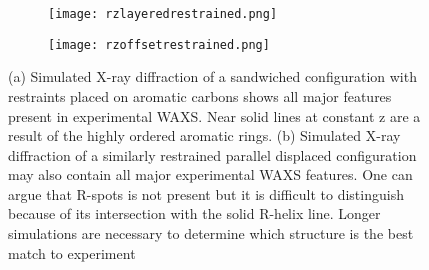 \begin{figure}
	\centering
	\begin{subfigure}{0.475\textwidth}
		\hspace{-1.2cm}
		\centering
		\texttt{[image: rzlayeredrestrained.png]}
		\caption{}\label{fig:rzplayeredrestrained}
	\end{subfigure}
	\begin{subfigure}{0.475\textwidth}
		\hspace{-1.2cm}
		\centering
		\texttt{[image: rzoffsetrestrained.png]}
		\caption{}\label{fig:rzoffsetrestrained}
	\end{subfigure}
	\caption{(a) Simulated X-ray diffraction of a sandwiched configuration
	with restraints placed on aromatic carbons shows all major features
	present in experimental WAXS. Near solid lines at constant z are a result of 
	the highly ordered aromatic rings. (b) Simulated X-ray diffraction of a similarly
	restrained parallel displaced configuration may also contain all
	major experimental WAXS features. One can argue that R-spots is not present
	but it is difficult to distinguish because of its intersection with the solid
	R-helix line. Longer simulations are necessary to determine which structure
	is the best match to experiment}\label{fig:XRDrestrained}
\end{figure}

